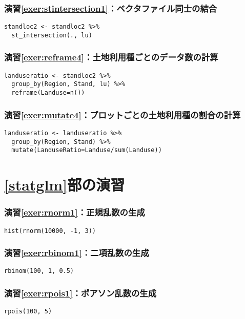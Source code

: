    \subsubsection*{演習\ref{exer:stintersection1}：ベクタファイル同士の結合}
\begin{verbatim}
standloc2 <- standloc2 %>%
  st_intersection(., lu)
\end{verbatim}

    \subsubsection*{演習\ref{exer:reframe4}：土地利用種ごとのデータ数の計算}
\begin{verbatim}
landuseratio <- standloc2 %>%
  group_by(Region, Stand, lu) %>%
  reframe(Landuse=n())
\end{verbatim}

    \subsubsection*{演習\ref{exer:mutate4}：プロットごとの土地利用種の割合の計算}
\begin{verbatim}
landuseratio <- landuseratio %>%
  group_by(Region, Stand) %>%
  mutate(LanduseRatio=Landuse/sum(Landuse))
\end{verbatim}

\section*{\ref{statglm}部の演習}
    \subsubsection*{演習\ref{exer:rnorm1}：正規乱数の生成}
\begin{verbatim}
hist(rnorm(10000, -1, 3))
\end{verbatim}

    \subsubsection*{演習\ref{exer:rbinom1}：二項乱数の生成}
\begin{verbatim}
rbinom(100, 1, 0.5)
\end{verbatim}

    \subsubsection*{演習\ref{exer:rpois1}：ポアソン乱数の生成}
\begin{verbatim}
rpois(100, 5)
\end{verbatim}

